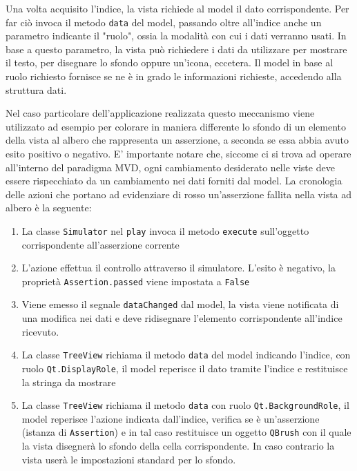 \documentclass[12pt]{toptesi}
\begin{document}
Una volta acquisito l'indice, la vista richiede al model il dato corrispondente. Per far ciò invoca il metodo \verb|data| del model, passando oltre all'indice anche un parametro indicante il "ruolo", ossia la modalità con cui i dati verranno usati. In base a questo parametro, la vista può richiedere i dati da utilizzare per mostrare il testo, per disegnare lo sfondo oppure un'icona, eccetera. Il model in base al ruolo richiesto fornisce se ne è in grado le informazioni richieste, accedendo alla struttura dati. 

Nel caso particolare dell'applicazione realizzata questo meccanismo viene utilizzato ad esempio per colorare in maniera differente lo sfondo di un elemento della vista al albero che rappresenta un asserzione, a seconda se essa abbia avuto esito positivo o negativo. E' importante notare che, siccome ci si trova ad operare all'interno del paradigma MVD, ogni cambiamento desiderato nelle viste deve essere rispecchiato da un cambiamento nei dati forniti dal model. La cronologia delle azioni che portano ad evidenziare di rosso un'asserzione fallita nella vista ad albero è la seguente:

\begin{enumerate}
\item La classe \verb|Simulator| nel \verb|play| invoca il metodo \verb|execute| sull'oggetto corrispondente all'asserzione corrente
\item L'azione effettua il controllo attraverso il simulatore. L'esito è negativo, la proprietà \verb|Assertion.passed| viene impostata a \verb|False|
\item Viene emesso il segnale \verb|dataChanged| dal model, la vista viene notificata di una modifica nei dati e deve ridisegnare l'elemento corrispondente all'indice ricevuto.
\item La classe \verb|TreeView| richiama il metodo \verb|data| del model indicando l'indice, con ruolo \verb|Qt.DisplayRole|, il model reperisce il dato tramite l'indice e restituisce la stringa da mostrare
\item La classe \verb|TreeView| richiama il metodo \verb|data| con ruolo \verb|Qt.BackgroundRole|, il model reperisce l'azione indicata dall'indice, verifica se è un'asserzione (istanza di \verb|Assertion|) e in tal caso restituisce un oggetto \verb|QBrush| con il quale la vista disegnerà lo sfondo della cella corrispondente. In caso contrario la vista userà le impostazioni standard per lo sfondo.
\end{enumerate}
\end{document}
